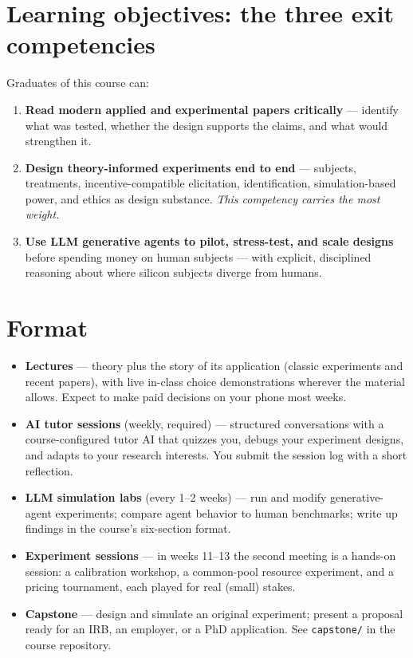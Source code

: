 \documentclass[11pt]{article}
\begin{document}
\section*{Learning objectives: the three exit competencies}
Graduates of this course can:
\begin{enumerate}[nosep]
  \item \textbf{Read modern applied and experimental papers
        critically} --- identify what was tested, whether the design
        supports the claims, and what would strengthen it.
  \item \textbf{Design theory-informed experiments end to end} ---
        subjects, treatments, incentive-compatible elicitation,
        identification, simulation-based power, and ethics as design
        substance. \emph{This competency carries the most weight.}
  \item \textbf{Use LLM generative agents to pilot, stress-test, and
        scale designs} before spending money on human subjects ---
        with explicit, disciplined reasoning about where silicon
        subjects diverge from humans.
\end{enumerate}

\section*{Format}
\begin{itemize}[nosep]
  \item \textbf{Lectures} --- theory plus the story of its application
        (classic experiments and recent papers), with live in-class
        choice demonstrations wherever the material allows. Expect to
        make paid decisions on your phone most weeks.
  \item \textbf{AI tutor sessions} (weekly, required) --- structured
        conversations with a course-configured tutor AI that quizzes
        you, debugs your experiment designs, and adapts to your
        research interests. You submit the session log with a short
        reflection.
  \item \textbf{LLM simulation labs} (every 1--2 weeks) --- run and
        modify generative-agent experiments; compare agent behavior to
        human benchmarks; write up findings in the course's
        six-section format.
  \item \textbf{Experiment sessions} --- in weeks 11--13 the second
        meeting is a hands-on session: a calibration workshop, a
        common-pool resource experiment, and a pricing tournament,
        each played for real (small) stakes.
  \item \textbf{Capstone} --- design and simulate an original
        experiment; present a proposal ready for an IRB, an employer,
        or a PhD application. See \texttt{capstone/} in the course
        repository.
\end{itemize}
\end{document}
